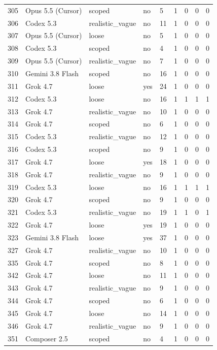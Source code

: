 \begin{tabular}{lllllllll}
305 & Opus 5.5 (Cursor) & scoped & no & 5 & 1 & 0 & 0 & 0 \\
306 & Codex 5.3 & realistic\_vague & no & 11 & 1 & 0 & 0 & 0 \\
307 & Opus 5.5 (Cursor) & loose & no & 5 & 1 & 0 & 0 & 0 \\
308 & Codex 5.3 & scoped & no & 4 & 1 & 0 & 0 & 0 \\
309 & Opus 5.5 (Cursor) & realistic\_vague & no & 7 & 1 & 0 & 0 & 0 \\
310 & Gemini 3.8 Flash & scoped & no & 16 & 1 & 0 & 0 & 0 \\
311 & Grok 4.7 & loose & yes & 24 & 1 & 0 & 0 & 0 \\
312 & Codex 5.3 & loose & no & 16 & 1 & 1 & 1 & 1 \\
313 & Grok 4.7 & realistic\_vague & no & 10 & 1 & 0 & 0 & 0 \\
314 & Grok 4.7 & scoped & no & 6 & 1 & 0 & 0 & 0 \\
315 & Codex 5.3 & realistic\_vague & no & 12 & 1 & 0 & 0 & 0 \\
316 & Codex 5.3 & scoped & no & 9 & 1 & 0 & 0 & 0 \\
317 & Grok 4.7 & loose & yes & 18 & 1 & 0 & 0 & 0 \\
318 & Grok 4.7 & realistic\_vague & no & 9 & 1 & 0 & 0 & 0 \\
319 & Codex 5.3 & loose & no & 16 & 1 & 1 & 1 & 1 \\
320 & Grok 4.7 & scoped & no & 9 & 1 & 0 & 0 & 0 \\
321 & Codex 5.3 & realistic\_vague & no & 19 & 1 & 1 & 0 & 1 \\
322 & Grok 4.7 & loose & yes & 19 & 1 & 0 & 0 & 0 \\
323 & Gemini 3.8 Flash & loose & yes & 37 & 1 & 0 & 0 & 0 \\
327 & Grok 4.7 & realistic\_vague & no & 10 & 1 & 0 & 0 & 0 \\
335 & Grok 4.7 & scoped & no & 8 & 1 & 0 & 0 & 0 \\
342 & Grok 4.7 & loose & no & 11 & 1 & 0 & 0 & 0 \\
343 & Grok 4.7 & realistic\_vague & no & 9 & 1 & 0 & 0 & 0 \\
344 & Grok 4.7 & scoped & no & 6 & 1 & 0 & 0 & 0 \\
345 & Grok 4.7 & loose & no & 14 & 1 & 0 & 0 & 0 \\
346 & Grok 4.7 & realistic\_vague & no & 9 & 1 & 0 & 0 & 0 \\
351 & Composer 2.5 & scoped & no & 4 & 1 & 0 & 0 & 0 \\

\end{tabular}
